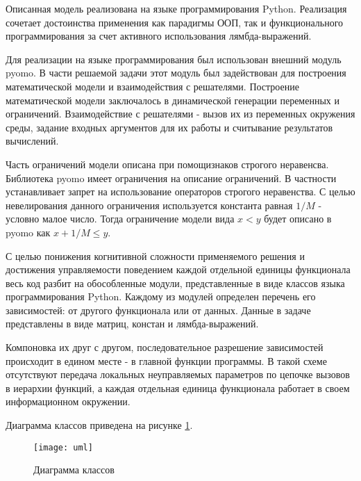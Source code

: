 

Описанная модель реализована на языке программирования Python. Реализация сочетает достоинства применения как парадигмы ООП, так и функционального программирования за счет активного использования лямбда-выражений.

Для реализации на языке программирования был использован внешний модуль pyomo. В части решаемой задачи этот модуль был задействован для построения математической модели и взаимодействия с решателями. Построение математической модели заключалось в динамической генерации переменных и ограничений. Взаимодействие с решателями - вызов их из переменных окружения среды, задание входных аргументов для их работы и считывание результатов вычислений.

Часть ограничений модели описана при помощизнаков строгого неравенсва. Библиотека pyomo имеет ограничения на описание ограничений. В частности устанавливает запрет на использование операторов строгого неравенства. С целью невелирования данного ограничения используется константа равная $1 / M$ - условно малое число. Тогда ограничение модели вида $x < y$ будет описано в pyomo как $x + 1 / M \le y$.

С целью понижения когнитивной сложности применяемого решения и достижения управляемости поведением каждой отдельной единицы функционала весь код разбит на обособленные модули, представленные в виде классов языка программирования Python. Каждому из модулей определен перечень его зависимостей: от другого функционала или от данных. Данные в задаче представлены в виде матриц, констан и лямбда-выражений.

Компоновка их друг с другом, последовательное разрешение зависимостей происходит в едином месте - в главной функции программы. В такой схеме отсутствуют передача локальных неуправляемых параметров по цепочке вызовов в иерархии функций, а каждая отдельная единица функционала работает в своем информационном окружении.

Диаграмма классов приведена на рисунке \ref{fig:uml}.

\begin{figure}[H]
    \centering
    \texttt{[image: uml]}
    \caption{Диаграмма классов}
    \label{fig:uml}
\end{figure}
